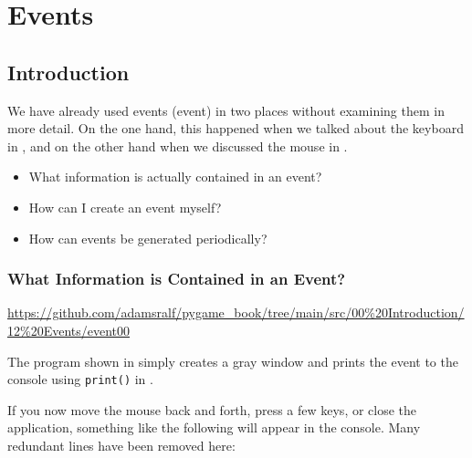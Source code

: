 \newpage
\section{Events}\label{secEvents}
\subsection{Introduction}
We have already used events (\gls{event}) in two places without examining them in more detail.  On the one hand, this happened when we talked about the keyboard in , and on the other hand when we discussed the mouse in . 

\begin{hintbox}
\begin{itemize}
	\item What information is actually contained in an event?
	\item How can I create an event myself?
	\item How can events be generated periodically?
\end{itemize}
\end{hintbox}
 

\subsubsection{What Information is Contained in an Event?}
\begin{diskbox}
	\url{https://github.com/adamsralf/pygame_book/tree/main/src/00%20Introduction/12%20Events/event00}
\end{diskbox}
The program shown in  simply creates a gray window and prints the event to the console using \texttt{print()} in .


If you now move the mouse back and forth, press a few keys, or close the application, something like the following will appear in the console. Many redundant lines have been removed here:

\newpage
{} 

